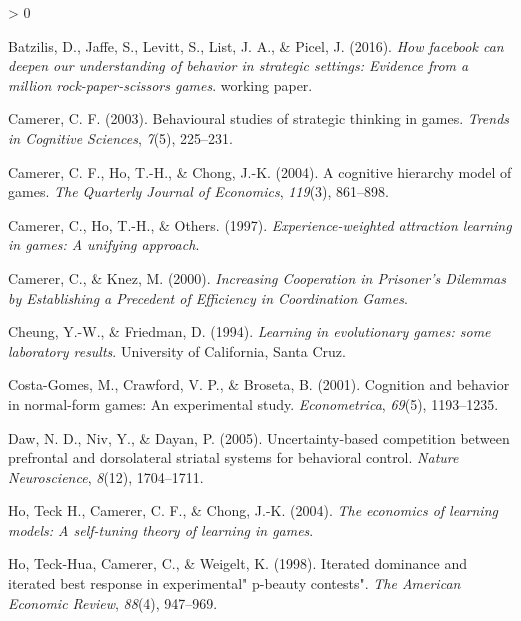 \documentclass[
  english,
  man,floatsintext]{apa6}
\newlength{\cslhangindent}
\newenvironment{CSLReferences}[2] %
 {%
  \setlength{\parindent}{0pt}
  \ifodd #1 \everypar{\setlength{\hangindent}{\cslhangindent}}\ignorespaces\fi
  \ifnum #2 > 0
  \setlength{\parskip}{#2\baselineskip}
  \fi
 }%
 {}
\begin{document}
\hypertarget{refs}{}
\begin{CSLReferences}{1}{0}
\leavevmode\hypertarget{ref-batzilis}{}%
Batzilis, D., Jaffe, S., Levitt, S., List, J. A., \& Picel, J. (2016). \emph{How facebook can deepen our understanding of behavior in strategic settings: Evidence from a million rock-paper-scissors games}. working paper.

\leavevmode\hypertarget{ref-camerer2003behavioural}{}%
Camerer, C. F. (2003). Behavioural studies of strategic thinking in games. \emph{Trends in Cognitive Sciences}, \emph{7}(5), 225--231.

\leavevmode\hypertarget{ref-camerer2004cognitive}{}%
Camerer, C. F., Ho, T.-H., \& Chong, J.-K. (2004). A cognitive hierarchy model of games. \emph{The Quarterly Journal of Economics}, \emph{119}(3), 861--898.

\leavevmode\hypertarget{ref-camerer1997experience}{}%
Camerer, C., Ho, T.-H., \& Others. (1997). \emph{{Experience-weighted attraction learning in games: A unifying approach}}.

\leavevmode\hypertarget{ref-knez2000}{}%
Camerer, C., \& Knez, M. (2000). \emph{{Increasing Cooperation in Prisoner's Dilemmas by Establishing a Precedent of Efficiency in Coordination Games}}.

\leavevmode\hypertarget{ref-cheung1994learning}{}%
Cheung, Y.-W., \& Friedman, D. (1994). \emph{{Learning in evolutionary games: some laboratory results}}. University of California, Santa Cruz.

\leavevmode\hypertarget{ref-costa2001cognition}{}%
Costa-Gomes, M., Crawford, V. P., \& Broseta, B. (2001). Cognition and behavior in normal-form games: An experimental study. \emph{Econometrica}, \emph{69}(5), 1193--1235.

\leavevmode\hypertarget{ref-daw2005uncertainty}{}%
Daw, N. D., Niv, Y., \& Dayan, P. (2005). Uncertainty-based competition between prefrontal and dorsolateral striatal systems for behavioral control. \emph{Nature Neuroscience}, \emph{8}(12), 1704--1711.

\leavevmode\hypertarget{ref-ho2004economics}{}%
Ho, Teck H., Camerer, C. F., \& Chong, J.-K. (2004). \emph{{The economics of learning models: A self-tuning theory of learning in games}}.

\leavevmode\hypertarget{ref-ho1998iterated}{}%
Ho, Teck-Hua, Camerer, C., \& Weigelt, K. (1998). {Iterated dominance and iterated best response in experimental" p-beauty contests"}. \emph{The American Economic Review}, \emph{88}(4), 947--969.


\end{CSLReferences}
\end{document}
